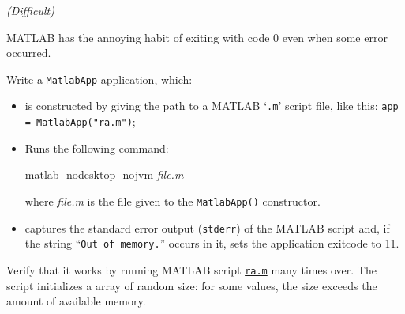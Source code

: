 \documentclass[english,serif,mathserif,xcolor=pdftex,dvipsnames,table]{beamer}
\begin{document}
\begin{frame}[fragile]
  \begin{exercise*}[6.C] \emph{(Difficult)} \small

    MATLAB has the annoying habit of exiting with code 0 even when some error occurred.

    \+
    Write a \texttt{MatlabApp} application, which:
    \begin{itemize}
    \item is constructed by giving the path to a MATLAB `\texttt{.m}'
      script file, like this: \texttt{app = MatlabApp("\href{https://github.com/uzh/gc3pie/blob/training-july-2016/docs/programmers/tutorials/workflows/downloads/ra.m}{ra.m}")};
    \item Runs the following command:
\begin{semiverbatim}
matlab -nodesktop -nojvm \emph{file.m}
\end{semiverbatim}
      where \emph{file.m} is the file given to the
      \texttt{MatlabApp()} constructor.
    \item captures the standard error output (\texttt{stderr}) of the
      MATLAB script and, if the string ``\texttt{Out of memory.}''
      occurs in it, sets the application exitcode to 11.
    \end{itemize}

    Verify that it works by running MATLAB script
    \href{https://github.com/uzh/gc3pie/blob/training-july-2016/docs/programmers/tutorials/workflows/downloads/ra.m}{\texttt{ra.m}}
    many times over.  The script initializes a array of random size:
    for some values, the size exceeds the amount of available memory.
  \end{exercise*}
\end{frame}



\end{document}
